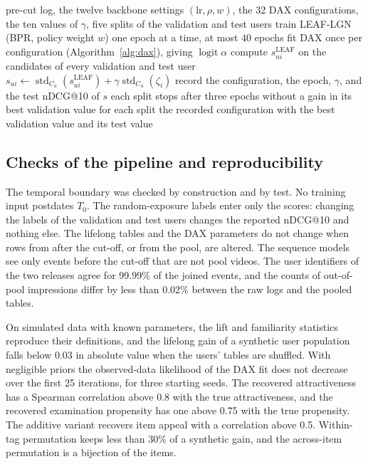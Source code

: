\documentclass[preprint,12pt,authoryear]{elsarticle}
\begin{document}
\begin{algorithm}[t]
\caption{Training and selection of LEAF-LGN+DAX}
\label{alg:leaflgn}
\begin{algorithmic}[1]
\Require pre-cut log, the twelve backbone settings $(\mathrm{lr},\rho,w)$, the 32 DAX configurations, the ten values of $\gamma$, five splits of the validation and test users
  \State train LEAF-LGN (BPR, policy weight $w$) one epoch at a time, at most 40 epochs
  \State fit DAX once per configuration (Algorithm~\ref{alg:dax}), giving $\operatorname{logit}\alpha$
    \State compute $s^{\mathrm{LEAF}}_{ui}$ on the candidates of every validation and test user
      \State $s_{ui}\gets\operatorname{std}_{C_u}(s^{\mathrm{LEAF}}_{ui})+\gamma\operatorname{std}_{C_u}(\zeta_i)$ 
          \State record the configuration, the epoch, $\gamma$, and the test nDCG@10 of $s$
        \EndIf
      \EndFor
    \EndFor
    \State each split stops after three epochs without a gain in its best validation value
  \EndFor
\EndFor
\State \Return for each split the recorded configuration with the best validation value and its test value
\end{algorithmic}
\end{algorithm}

\subsection{Checks of the pipeline and reproducibility}\label{app:controls}

The temporal boundary was checked by construction and by test. No training input postdates $T_0$. The random-exposure labels enter only the scores:
changing the labels of the validation and test users changes the reported nDCG@10 and nothing else. The lifelong tables and the DAX parameters do not change
when rows from after the cut-off, or from the pool, are altered. The sequence models see only events before the cut-off that are not pool videos. The user
identifiers of the two releases agree for 99.99\% of the joined events, and the counts of out-of-pool impressions differ by less than 0.02\% between the raw
logs and the pooled tables.

On simulated data with known parameters, the lift and familiarity statistics reproduce their definitions, and the lifelong gain of a synthetic user population
falls below 0.03 in absolute value when the users' tables are shuffled. With negligible priors the observed-data likelihood of the DAX fit does not decrease over the first 25
iterations, for three starting seeds. The recovered attractiveness has a Spearman correlation above 0.8 with the true attractiveness, and the recovered
examination propensity has one above 0.75 with the true propensity. The additive variant recovers item appeal with a correlation above 0.5. Within-tag
permutation keeps less than 30\% of a synthetic gain, and the across-item permutation is a bijection of the items.
\end{document}
